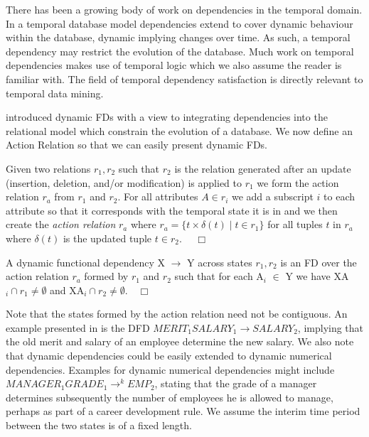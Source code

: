 \medskip

There has been a growing body of work on dependencies in the temporal
domain. In a temporal database model dependencies extend to cover
dynamic behaviour within the database, dynamic implying changes over
time.  As such, a temporal dependency may
restrict the evolution of the database. Much work on temporal
dependencies makes use of temporal logic \cite{eme90,mp92} which we
also 
assume the reader is familiar with. The field of temporal dependency
satisfaction is directly relevant to temporal data mining. 


\cite{Via87,Via88} introduced dynamic FDs with a view to integrating
dependencies into the relational model which constrain the evolution of
a database. We
now define an Action Relation so that we can easily present dynamic FDs.
\begin{definition}
\begin{rm}
Given two relations $r_1, r_2$ such that $r_2$ is the relation
generated after an update (insertion, deletion, and/or modification) 
is applied to $r_1$ we form the action relation $r_a$ from $r_1$ and $r_2$.
 For all attributes $A \in r_i$ we add a subscript
$i$ to each attribute so that it corresponds with the temporal state
it is in and we then create the {\em action relation} $r_a$ where
$r_a = \{ t \times \delta(t) \mid t \in r_1 \}$ for all tuples $t$ in
$r_a$ where 
$\delta (t) $ is the updated tuple $t \in r_2$. $\quad\Box$
\end{rm}
\end{definition}
\begin{definition}
\begin{rm}
A dynamic functional dependency X $\to$ Y across states $r_1, r_2$
is an FD over the action relation $r_a$ formed by $r_1$ and $r_2$ such
that for each A$_i$ $\in$ Y we have XA$_i \cap r_1 \not= \emptyset$ and 
XA$_i \cap r_2 \not= \emptyset$.$\quad\Box$
\end{rm}
\end{definition}

Note that the states formed by the action relation need not be contiguous.
An example presented in \cite{Via87} is the DFD $MERIT_1 SALARY_1 \to
SALARY_2$, implying that the old merit and salary of an employee determine the 
new salary. We also note that dynamic dependencies could be easily
extended to dynamic numerical dependencies.  Examples for dynamic
numerical dependencies might include $MANAGER_1 GRADE_1 \to^k EMP_2$, stating that the grade of a manager determines subsequently the number
of employees he is allowed to manage, perhaps as part of a career
development rule.  We assume the
interim time period between the two states is of a fixed length.

